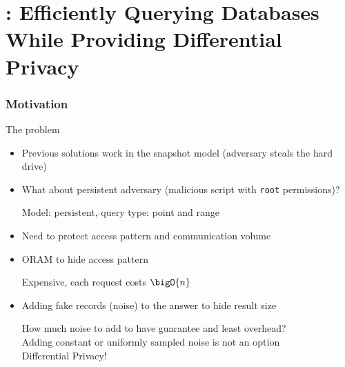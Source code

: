 \section{\epsolute{}: Efficiently Querying Databases While Providing Differential Privacy~\cite{epsolute}}

	\begin{frame}[label={frame:epsolute-motivation}]

		\frametitle{Motivation}

		\begin{block}{The problem}

			\begin{itemize}
				\item<1-> Previous solutions work in the snapshot model (adversary steals the hard drive)
				\item<1->
					What about persistent adversary (malicious script with \texttt{root} permissions)? \\
					\begin{small}
						Model: \alert{persistent}, query type: \alert{point} and \alert{range}
					\end{small}
				\item<1-> Need to protect \alert{access pattern} and \alert{communication volume}
				\item<2->
					ORAM to hide access pattern \\
					\begin{small}
						Expensive, each request costs $\bigO{n}$ \hyperlink{frame:appendix:oram}{}
					\end{small}
				\item<3->
					Adding fake records (noise) to the answer to hide result size \\
					\begin{small}
						How much noise to add to have guarantee and least overhead? \\
						Adding constant or uniformly sampled noise is not an option \\
						Differential Privacy!
					\end{small}
			\end{itemize}

		\end{block}

	\end{frame}

